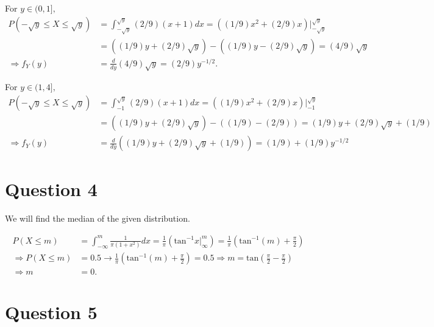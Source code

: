 \documentclass[11pt]{article} %
\begin{document}
For $y \in (0,1],$
\begin{align*}
P(-\sqrt{y}\leq X \leq \sqrt{y}) &= \int_{-\sqrt{y}}^{\sqrt{y}} (2/9) (x+1) dx = ((1/9)x^2  + (2/9)x)|_{-\sqrt{y}}^{\sqrt{y}}\\
 &= ((1/9)y + (2/9)\sqrt{y}) -((1/9)y - (2/9)\sqrt{y}) = (4/9) \sqrt{y} \\
\Rightarrow f_Y(y) &= \frac{d}{dy} (4/9)\sqrt{y} = (2/9)y^{-1/2}.
\end{align*}

For $y \in (1,4],$
\begin{align*}
P(-\sqrt{y}\leq X \leq \sqrt{y}) &= \int_{-1}^{\sqrt{y}} (2/9) (x+1) dx = ((1/9)x^2  + (2/9)x)|_{-1}^{\sqrt{y}}\\
 &= ((1/9)y + (2/9)\sqrt{y}) -((1/9) - (2/9)) = (1/9)y + (2/9)\sqrt{y} + (1/9) \\
\Rightarrow f_Y(y) &= \frac{d}{dy} \left((1/9)y + (2/9)\sqrt{y} + (1/9)\right)  = (1/9) +(1/9)y^{-1/2}
\end{align*}

\section{Question 4}
We will find the median of the given distribution.

\begin{align*}
P(X\leq m) &= \int_{-\infty}^m \frac{1}{\pi (1+x^2)} dx = \frac{1}{\pi}(\text{tan}^{-1} x |_{\infty}^{m}) = \frac{1}{\pi}\left(\text{tan}^{-1}(m) + \frac{\pi}{2}\right) \\
\Rightarrow P(X \leq m) &= 0.5 \rightarrow \frac{1}{\pi}\left( \text{tan}^{-1}(m) + \frac{\pi}{2}\right) = 0.5 \Rightarrow m = \text{tan}\left(\frac{\pi}{2} - \frac{\pi}{2}\right)\\
\Rightarrow m &= 0.
\end{align*}

\section{Question 5}
%
\end{document}
